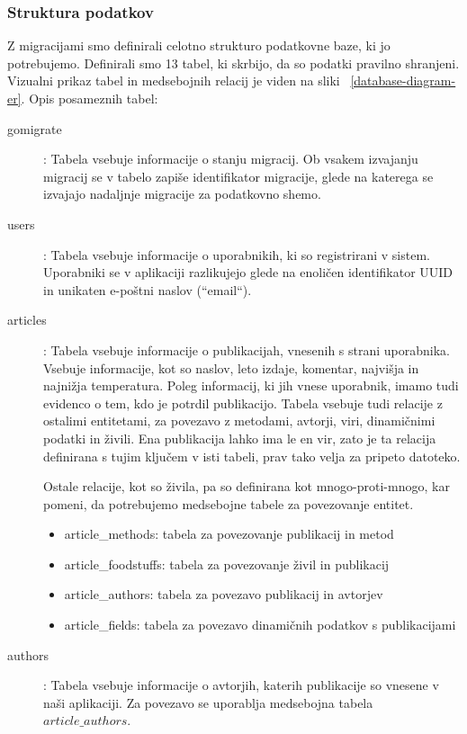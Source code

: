 \documentclass[a4paper, 12pt]{book}
\begin{document}
\subsubsection{ Struktura podatkov }
Z migracijami smo definirali celotno strukturo podatkovne baze, ki jo potrebujemo. Definirali smo 13 tabel, ki skrbijo, da so podatki pravilno shranjeni. Vizualni prikaz tabel in medsebojnih relacij je viden na sliki ~\ref{database-diagram-er}. Opis posameznih tabel:
\begin{description}
\item[gomigrate]: Tabela vsebuje informacije o stanju migracij. Ob vsakem izvajanju migracij se v tabelo zapiše identifikator migracije, glede na katerega se izvajajo nadaljnje migracije za podatkovno shemo. 

\item[users]: Tabela vsebuje informacije o uporabnikih, ki so registrirani v sistem. Uporabniki se v aplikaciji razlikujejo glede na enoličen identifikator UUID in unikaten e-poštni naslov (``email``). 

\item[articles]: Tabela vsebuje informacije o publikacijah, vnesenih s strani uporabnika. Vsebuje informacije, kot so naslov, leto izdaje, komentar, najvišja in najnižja temperatura. Poleg informacij, ki jih vnese uporabnik, imamo tudi evidenco o tem, kdo je potrdil publikacijo. Tabela vsebuje tudi relacije z ostalimi entitetami, za povezavo z metodami, avtorji, viri, dinamičnimi podatki in živili. Ena publikacija lahko ima le en vir, zato je ta relacija definirana s tujim ključem v isti tabeli, prav tako velja za pripeto datoteko. 

Ostale relacije, kot so živila, pa so definirana kot mnogo-proti-mnogo, kar pomeni, da potrebujemo medsebojne tabele za povezovanje entitet.
\begin{itemize}
    \item article\_methods: tabela za povezovanje publikacij in metod
    \item article\_foodstuffs: tabela za povezovanje živil in publikacij
    \item article\_authors: tabela za povezavo publikacij in avtorjev
    \item article\_fields: tabela za povezavo dinamičnih podatkov s publikacijami
\end{itemize}

\item[authors]: Tabela vsebuje informacije o avtorjih, katerih publikacije so vnesene v naši aplikaciji. Za povezavo se uporablja medsebojna tabela $article\_authors$.


\end{description}
\end{document}
